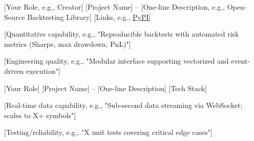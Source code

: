 

\begin{cventries}

  \cventry
    {[Your Role, e.g., Creator]} %
    {[Project Name] -- [One-line Description, e.g., Open-Source Backtesting Library]} %
    {[Links, e.g., \href{https://pypi.org/project/your-package/}{PyPI}]} %
    {} %
    {
      \begin{cvitems}
        \item {[Quantitative capability, e.g., "Reproducible backtests with automated risk metrics (Sharpe, max drawdown, PnL)"]}
        \item {[Engineering quality, e.g., "Modular interface supporting vectorized and event-driven execution"]}
      \end{cvitems}
    }

  \cventry
    {[Your Role]} %
    {[Project Name] -- [One-line Description]} %
    {[Tech Stack]} %
    {} %
    {
      \begin{cvitems}
        \item {[Real-time data capability, e.g., "Sub-second data streaming via WebSocket; scales to X+ symbols"]}
        \item {[Testing/reliability, e.g., "X unit tests covering critical edge cases"]}
      \end{cvitems}
    }

\end{cventries}
